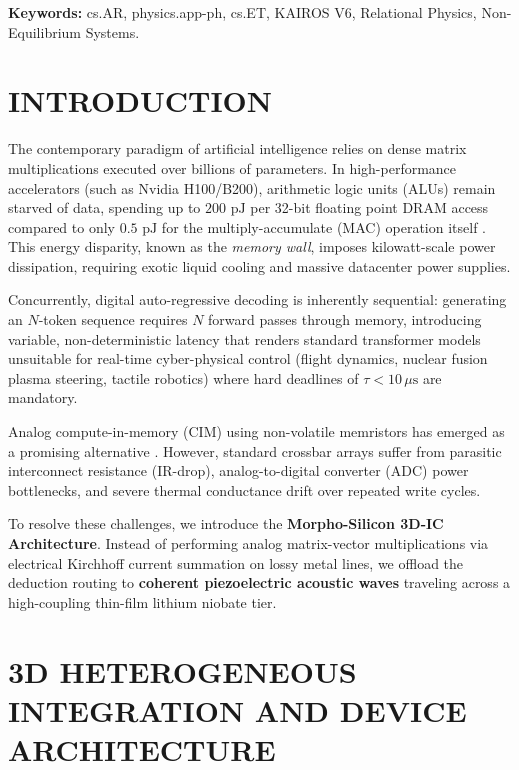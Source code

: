 \documentclass[10pt,twocolumn]{article}
\begin{document}
\vspace{1em}
\noindent\textbf{Keywords:} cs.AR, physics.app-ph, cs.ET, KAIROS V6, Relational Physics, Non-Equilibrium Systems.

\vspace{1em}






\section{INTRODUCTION}

The contemporary paradigm of artificial intelligence relies on dense matrix multiplications executed over billions of parameters. In high-performance accelerators (such as Nvidia H100/B200), arithmetic logic units (ALUs) remain starved of data, spending up to $200\text{ pJ}$ per 32-bit floating point DRAM access compared to only $0.5\text{ pJ}$ for the multiply-accumulate (MAC) operation itself \cite{Horowitz2014}. This energy disparity, known as the \textit{memory wall}, imposes kilowatt-scale power dissipation, requiring exotic liquid cooling and massive datacenter power supplies.

Concurrently, digital auto-regressive decoding is inherently sequential: generating an $N$-token sequence requires $N$ forward passes through memory, introducing variable, non-deterministic latency that renders standard transformer models unsuitable for real-time cyber-physical control (flight dynamics, nuclear fusion plasma steering, tactile robotics) where hard deadlines of $\tau < 10 \, \mu\text{s}$ are mandatory.

Analog compute-in-memory (CIM) using non-volatile memristors has emerged as a promising alternative \cite{Ielmini2018, Sebastian2020}. However, standard crossbar arrays suffer from parasitic interconnect resistance (IR-drop), analog-to-digital converter (ADC) power bottlenecks, and severe thermal conductance drift over repeated write cycles.

To resolve these challenges, we introduce the \textbf{Morpho-Silicon 3D-IC Architecture}. Instead of performing analog matrix-vector multiplications via electrical Kirchhoff current summation on lossy metal lines, we offload the deduction routing to \textbf{coherent piezoelectric acoustic waves} traveling across a high-coupling thin-film lithium niobate tier.



\section{3D HETEROGENEOUS INTEGRATION AND DEVICE ARCHITECTURE}
\end{document}

